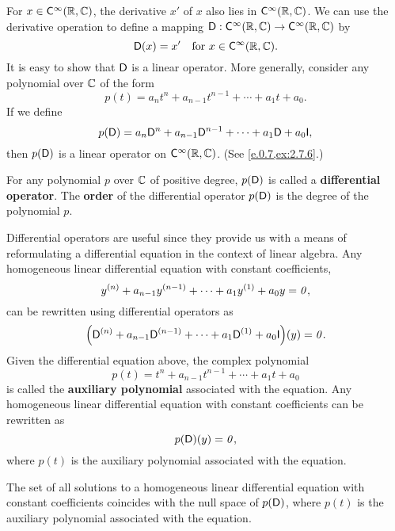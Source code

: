 \begin{defn}\label{2.7.5}
	For \(x \in \cfs[\infty](\R, \C)\), the derivative \(x'\) of \(x\) also lies in \(\cfs[\infty](\R, \C)\).
	We can use the derivative operation to define a mapping \(\Dop : \cfs[\infty](\R, \C) \to \cfs[\infty](\R, \C)\) by
	\[
		\Dop(x) = x' \quad \text{for } x \in \cfs[\infty](\R, \C).
	\]
	It is easy to show that \(\mathsf{D}\) is a linear operator.
	More generally, consider any polynomial over \(\mathbb{C}\) of the form
	\[
		p(t) = a_n t^n + a_{n - 1} t^{n - 1} + \cdots + a_1 t + a_0.
	\]
	If we define
	\[
		p(\Dop) = a_n \Dop^n + a_{n - 1} \Dop^{n - 1} + \cdots + a_1 \Dop + a_0 \IT,
	\]
	then \(p(\mathsf{D})\) is a linear operator on \(\cfs[\infty](\R, \C)\).
	(See \cref{e.0.7,ex:2.7.6}.)

	For any polynomial \(p\) over \(\mathbb{C}\) of positive degree, \(p(\mathsf{D})\) is called a \textbf{differential operator}.
	The \textbf{order} of the differential operator \(p(\mathsf{D})\) is the degree of the polynomial \(p\).

	Differential operators are useful since they provide us with a means of reformulating a differential equation in the context of linear algebra.
	Any homogeneous linear differential equation with constant coefficients,
	\[
		y^{(n)} + a_{n - 1} y^{(n - 1)} + \cdots + a_1 y^{(1)} + a_0 y = \mathit{0},
	\]
	can be rewritten using differential operators as
	\[
		\pa{\Dop^{(n)} + a_{n - 1} \Dop^{(n - 1)} + \cdots + a_1 \Dop^{(1)} + a_0 \IT}(y) = \zv.
	\]
	Given the differential equation above, the complex polynomial
	\[
		p(t) = t^n + a_{n - 1} t^{n - 1} + \cdots + a_1 t + a_0
	\]
	is called the \textbf{auxiliary polynomial} associated with the equation.
	Any homogeneous linear differential equation with constant coefficients can be rewritten as
	\[
		p(\mathsf{D})(y) = \mathit{0},
	\]
	where \(p(t)\) is the auxiliary polynomial associated with the equation.
\end{defn}

\begin{thm}\label{2.28}
	The set of all solutions to a homogeneous linear differential equation with constant coefficients coincides with the null space of \(p(\mathsf{D})\), where \(p(t)\) is the auxiliary polynomial associated with the equation.
\end{thm}

